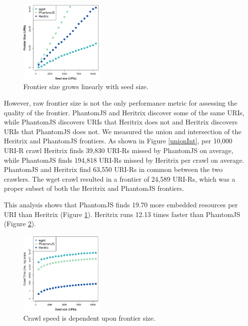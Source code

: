 \documentclass{ipres_proc_article-sp}
\begin{document}
\begin{figure}
 \begin{center}
    \includegraphics[width=0.37\textwidth,keepaspectratio]{./imgs/predictGrowthFunction3.png}
  \end{center}
  \caption{Frontier size grows linearly with seed size.}
  \label{frontierGrowth}
\end{figure}

However, raw frontier size is not the only performance metric for assessing the quality of the frontier. PhantomJS and Heritrix discover some of the same URIs, while PhantomJS discovers URIs that Heritrix does not and Heritrix discovers URIs that PhantomJS does not. We measured the union and intersection of the Heritrix and PhantomJS frontiers. As shown in Figure \ref{unionInt}, per 10,000 URI-R crawl Heritrix finds 39,830 URI-Rs missed by PhantomJS on average, while PhantomJS finds 194,818 URI-Rs missed by Heritrix per crawl on average. PhantomJS and Heritrix find 63,550 URI-Rs in common between the two crawlers. The wget crawl resulted in a frontier of 24,589 URI-Rs, which was a proper subset of both the Heritrix and PhantomJS frontiers.


This analysis shows that PhantomJS finds 19.70 more embedded resources per URI than Heritrix (Figure \ref{frontierGrowth}). Heritrix runs 12.13 times faster than PhantomJS (Figure \ref{speedGrowth}). %


\begin{figure}[t]
 \begin{center}
    \includegraphics[width=0.37\textwidth,keepaspectratio]{./imgs/predictGrowthFunctionTime3.png}
  \end{center}
  \caption{Crawl speed is dependent upon frontier size.}
  \label{speedGrowth}
\end{figure}
\vskip -3mm
\end{document}
